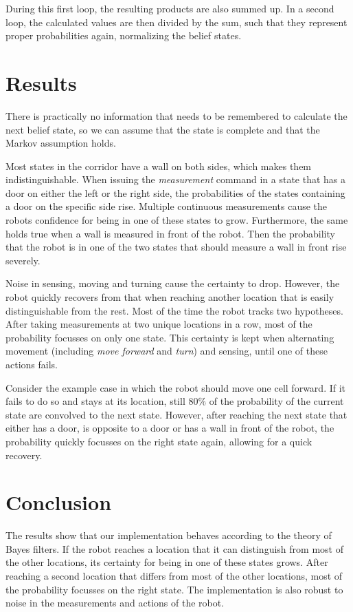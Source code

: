 \documentclass[10pt,a4paper]{article}
\begin{document}
		During this first loop, the resulting products are also summed up. In a second loop, the calculated values are then divided by the sum, such that they represent proper probabilities again, normalizing the belief states.
	
	\section{Results}
	There is practically no information that needs to be remembered to calculate the next belief state, so we can assume that the state is complete and that the Markov assumption holds.
	
	Most states in the corridor have a wall on both sides, which makes them indistinguishable.
	When issuing the \textit{measurement} command in a state that has a door on either the left or the right side, the probabilities of the states containing a door on the specific side rise. Multiple continuous measurements cause the robots confidence for being in one of these states to grow.
	Furthermore, the same holds true when a wall is measured in front of the robot. Then the probability that the robot is in one of the two states that should measure a wall in front rise severely.
	
	Noise in sensing, moving and turning cause the certainty to drop. However, the robot quickly recovers from that when reaching another location that is easily distinguishable from the rest.
	Most of the time the robot tracks two hypotheses. After taking measurements at two unique locations in a row, most of the probability focusses on only one state. This certainty is kept when alternating movement (including \textit{move forward} and \textit{turn}) and sensing, until one of these actions fails.
	
	Consider the example case in which the robot should move one cell forward. If it fails to do so and stays at its location, still $80\%$ of the probability of the current state are convolved to the next state. However, after reaching the next state that either has a door, is opposite to a door or has a wall in front of the robot, the probability quickly focusses on the right state again, allowing for a quick recovery.
	
	\section{Conclusion}
	The results show that our implementation behaves according to the theory of Bayes filters. If the robot reaches a location that it can distinguish from most of the other locations, its certainty for being in one of these states grows. After reaching a second location that differs from most of the other locations, most of the probability focusses on the right state. The implementation is also robust to noise in the measurements and actions of the robot.
	
\end{document}
